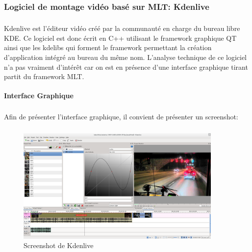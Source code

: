 \subsubsection {Logiciel de montage vidéo basé sur MLT: Kdenlive}

\subparagraph{}

Kdenlive est l'éditeur vidéo créé par la communauté en charge
du bureau libre KDE. Ce logiciel est donc écrit en C++ utilisant le
framework graphique QT  ainsi que les kdelibs qui forment le framework
permettant la création d'application intégré au bureau du même nom.
L'analyse technique de ce logiciel n'a pas vraiment d'intérêt car
on est en présence d'une interface graphique tirant partit du framework MLT.

\paragraph {Interface Graphique}

\subparagraph{}

Afin de présenter l'interface graphique, il convient de présenter
un screenshot:

\subparagraph{}

\begin{figure}[H]

  \begin{center}

    \includegraphics[width=0.90\textwidth]{images/kdenlive}

  \end{center}

  \caption{Screenshot de Kdenlive}

  \label{Yes}

\end{figure}

